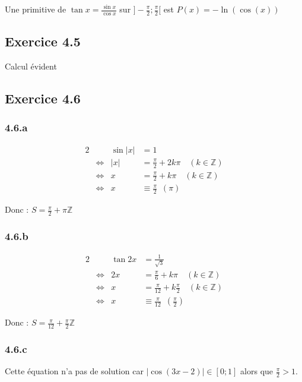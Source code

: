 \documentclass[a4paper,10pt]{report}
\begin{document}
Une primitive de $\tan x = \frac{\sin x}{\cos x}$ sur $]-\frac{\pi}{2} ; \frac{\pi}{2}[$ est $P(x)=-\ln(\cos(x))$

\subsection*{Exercice 4.5}

Calcul évident

\subsection*{Exercice 4.6}

\subsubsection*{4.6.a}
\begin{alignat*}{2}
	&                    & \sin |x| &= 1 \\
	&\Longleftrightarrow & |x| &= \frac{\pi}{2} + 2k\pi \quad (k \in \mathbb{Z}) \\
	&\Longleftrightarrow &   x &= \frac{\pi}{2} + k\pi \quad (k \in \mathbb{Z}) \\
	&\Longleftrightarrow &   x &\equiv \frac{\pi}{2} \enspace (\pi)
\end{alignat*}

Donc : $S =  \frac{\pi}{2} + \pi\mathbb{Z}$

\subsubsection*{4.6.b}
\begin{alignat*}{2}
	&                    & \tan 2x &= \frac{1}{\sqrt{3}} \\
	&\Longleftrightarrow & 2x      &= \frac{\pi}{6} + k\pi \quad (k \in \mathbb{Z}) \\
	&\Longleftrightarrow & x       &= \frac{\pi}{12} + k\frac{\pi}{2} \quad (k \in \mathbb{Z}) \\
	&\Longleftrightarrow &       x &\equiv \frac{\pi}{12} \enspace \left(\frac{\pi}{2}\right)
\end{alignat*}

Donc : $S =  \frac{\pi}{12} + \frac{\pi}{2}\mathbb{Z}$

\subsubsection*{4.6.c}

Cette équation n'a pas de solution car $|\cos(3x-2)| \in [0 ; 1]$ alors que $\frac{\pi}{2} > 1$.
\end{document}

